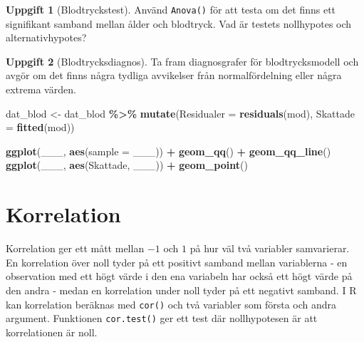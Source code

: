\documentclass[
]{book}
\newenvironment{Shaded}{\begin{snugshade}}{\end{snugshade}}
\newcommand{\AttributeTok}[1]{\textcolor[rgb]{0.13,0.29,0.53}{#1}}
\newcommand{\FunctionTok}[1]{\textcolor[rgb]{0.13,0.29,0.53}{\textbf{#1}}}
\newcommand{\NormalTok}[1]{#1}
\newcommand{\OtherTok}[1]{\textcolor[rgb]{0.56,0.35,0.01}{#1}}
\newcommand{\SpecialCharTok}[1]{\textcolor[rgb]{0.81,0.36,0.00}{\textbf{#1}}}
\theoremstyle{definition}
\theoremstyle{definition}
\theoremstyle{definition}
\newtheorem{exercise}{Uppgift}[chapter]
\theoremstyle{definition}
\theoremstyle{remark}
\begin{document}
\begin{exercise}[Blodtryckstest]
Använd \texttt{Anova()} för att testa om det finns ett signifikant samband mellan ålder och blodtryck. Vad är testets nollhypotes och alternativhypotes?
\end{exercise}

\begin{exercise}[Blodtrycksdiagnos]

Ta fram diagnosgrafer för blodtrycksmodell och avgör om det finns några tydliga avvikelser från normalfördelning eller några extrema värden.

\begin{Shaded}
\begin{Highlighting}[]
\NormalTok{dat\_blod }\OtherTok{\textless{}{-}}\NormalTok{ dat\_blod }\SpecialCharTok{\%\textgreater{}\%} 
  \FunctionTok{mutate}\NormalTok{(}\AttributeTok{Residualer =} \FunctionTok{residuals}\NormalTok{(mod),}
         \AttributeTok{Skattade =} \FunctionTok{fitted}\NormalTok{(mod))}

\FunctionTok{ggplot}\NormalTok{(\_\_\_, }\FunctionTok{aes}\NormalTok{(}\AttributeTok{sample =}\NormalTok{ \_\_\_)) }\SpecialCharTok{+} \FunctionTok{geom\_qq}\NormalTok{() }\SpecialCharTok{+} \FunctionTok{geom\_qq\_line}\NormalTok{()}
\FunctionTok{ggplot}\NormalTok{(\_\_\_, }\FunctionTok{aes}\NormalTok{(Skattade, \_\_\_)) }\SpecialCharTok{+} \FunctionTok{geom\_point}\NormalTok{()}
\end{Highlighting}
\end{Shaded}

\end{exercise}

\section{Korrelation}\label{korrelation}

Korrelation ger ett mått mellan \(-1\) och \(1\) på hur väl två variabler samvarierar. En korrelation över noll tyder på ett positivt samband mellan variablerna - en observation med ett högt värde i den ena variabeln har också ett högt värde på den andra - medan en korrelation under noll tyder på ett negativt samband. I R kan korrelation beräknas med \texttt{cor()} och två variabler som första och andra argument. Funktionen \texttt{cor.test()} ger ett test där nollhypotesen är att korrelationen är noll.

\begin{Shaded}
\end{Shaded}
\end{document}
